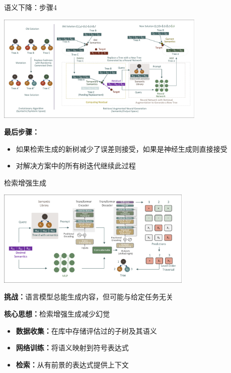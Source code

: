 \documentclass[aspectratio=1610]{beamer}
\begin{document}
    \begin{frame}{语义下降：步骤4}
        \begin{center}
            \includegraphics[width=0.75\textwidth, trim=8pt 8pt 8pt 8pt, clip]{figs/Motivation.pdf}
        \end{center}

        \textbf{最后步骤：}
        \begin{itemize}
            \item 如果检索生成的新树减少了误差则接受，如果是神经生成则直接接受
            \item 对解决方案中的所有树迭代继续此过程
        \end{itemize}
    \end{frame}

    \begin{frame}{检索增强生成}
        \begin{center}
            \includegraphics[width=0.7\textwidth]{figs/NN.pdf}
        \end{center}

        \textbf{挑战：}语言模型总能生成内容，但可能与给定任务无关

        \textbf{核心思想：}检索增强生成减少幻觉

        \begin{itemize}
            \item \textbf{数据收集：}在库中存储评估过的子树及其语义
            \item \textbf{网络训练：}将语义映射到符号表达式
            \item \textbf{检索：}从有前景的表达式提供上下文
        \end{itemize}
    \end{frame}
\end{document}
